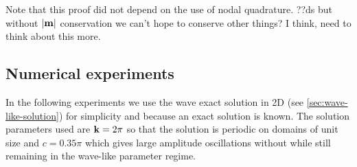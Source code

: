 
Note that this proof did not depend on the use of nodal quadrature.
??ds but without $|\mathbf{m}|$ conservation we can't hope to conserve other things? I think, need to think about this more.


\subsection{Numerical experiments}
\label{sec:numer-exper}

In the following experiments we use the wave exact solution in 2D (see \cref{sec:wave-like-solution}) for simplicity and because an exact solution is known.
The solution parameters used are $\mathbf{k} = 2\pi$ so that the solution is periodic on domains of unit size and $c = 0.35\pi$ which gives large amplitude oscillations without while still remaining in the wave-like parameter regime.

